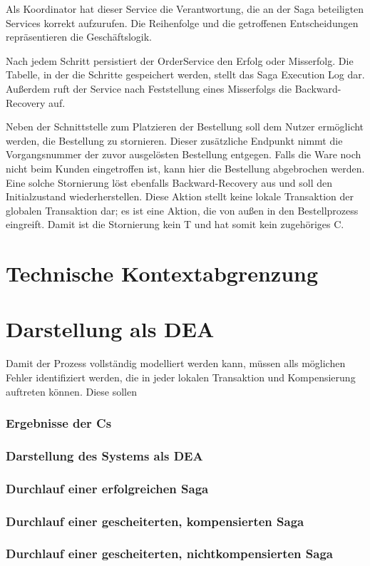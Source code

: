 Als Koordinator hat dieser Service die Verantwortung, die an der Saga beteiligten Services korrekt aufzurufen. Die Reihenfolge und die getroffenen Entscheidungen repräsentieren die Geschäftslogik. 

Nach jedem Schritt persistiert der OrderService den Erfolg oder Misserfolg. Die Tabelle, in der die Schritte gespeichert werden, stellt das Saga Execution Log dar. Außerdem ruft der Service nach Feststellung eines Misserfolgs die Backward-Recovery auf. 

Neben der Schnittstelle zum Platzieren der Bestellung soll dem Nutzer ermöglicht werden, die Bestellung zu stornieren. Dieser zusätzliche Endpunkt nimmt die Vorgangsnummer der zuvor ausgelösten Bestellung entgegen. Falls die Ware noch nicht beim Kunden eingetroffen ist, kann hier die Bestellung abgebrochen werden. Eine solche Stornierung löst ebenfalls Backward-Recovery aus und soll den Initialzustand wiederherstellen. Diese Aktion stellt keine lokale Transaktion der globalen Transaktion dar; es ist eine Aktion, die von außen in den Bestellprozess eingreift. Damit ist die Stornierung kein T und hat somit kein zugehöriges C.

\section{Technische Kontextabgrenzung}

\section{Darstellung als DEA}
Damit der Prozess vollständig modelliert werden kann, müssen alls möglichen Fehler identifiziert werden, die in jeder lokalen Transaktion und Kompensierung auftreten können. Diese sollen 

\subsubsection{Ergebnisse der Cs}

\subsubsection{Darstellung des Systems als DEA}

\subsubsection{Durchlauf einer erfolgreichen Saga}

\subsubsection{Durchlauf einer gescheiterten, kompensierten Saga}

\subsubsection{Durchlauf einer gescheiterten, nichtkompensierten Saga}

